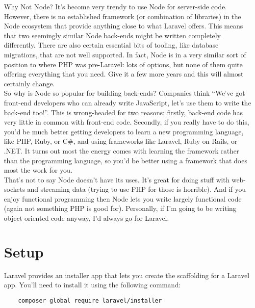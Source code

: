 \begin{infobox}{Why Not Node?}
    It's become very trendy to use Node for server-side code.
    \\

    However, there is no established framework (or combination of libraries) in the Node ecosystem that provide anything close to what Laravel offers. This means that two seemingly similar Node back-ends might be written completely differently. There are also certain essential bits of tooling, like database migrations, that are not well supported. In fact, Node is in a very similar sort of position to where PHP was pre-Laravel: lots of options, but none of them quite offering everything that you need. Give it a few more years and this will almost certainly change.
    \\

    So why is Node so popular for building back-ends? Companies think ``We've got front-end developers who can already write JavaScript, let's use them to write the back-end too!''. This is wrong-headed for two reasons: firstly, back-end code has very little in common with front-end code. Secondly, if you really have to do this, you'd be much better getting developers to learn a new programming language, like PHP, Ruby, or C\#, and using frameworks like Laravel, Ruby on Rails, or .NET. It turns out most the energy comes with learning the framework rather than the programming language, so you'd be better using a framework that does most the work for you.
    \\

    That's not to say Node doesn't have its uses. It's great for doing stuff with web-sockets and streaming data (trying to use PHP for those is horrible). And if you enjoy functional programming then Node lets you write largely functional code (again not something PHP is good for). Personally, if I'm going to be writing object-oriented code anyway, I'd always go for Laravel.
\end{infobox}


\section{Setup}

Laravel provides an installer app that lets you create the scaffolding for a Laravel app. You'll need to install it using the following command:

\begin{verbatim}
    composer global require laravel/installer
\end{verbatim}

